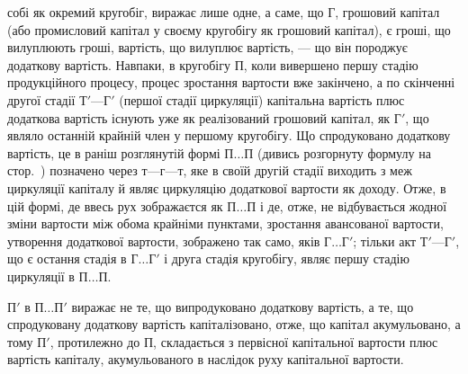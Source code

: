 \parcont{}  %
собі як окремий кругобіг, виражає лише одне, а саме, що $Г$, грошовий
капітал (або промисловий капітал у своєму кругобігу як грошовий
капітал), є гроші, що вилуплюють гроші, вартість, що вилуплює вартість,
— що він породжує додаткову вартість. Навпаки, в кругобігу $П$,
коли вивершено першу стадію продукційного процесу, процес зростання
вартости вже закінчено, а по скінченні другої стадії $Т' — Г'$ (першої
стадії циркуляції) капітальна вартість плюс додаткова вартість існують
уже як реалізований грошовий капітал, як $Г'$, що являло останній крайній
член у першому кругобігу. Що спродуковано додаткову вартість, це в
раніш розглянутій формі $П\dots{}П$ (дивись розгорнуту формулу на стор.~\pageref{original-41})
позначено через $т — г — т$, яке в своїй другій стадії виходить
з меж циркуляції капіталу й являє циркуляцію додаткової вартости як
доходу. Отже, в цій формі, де ввесь рух зображаєтся як $П\dots{} П$ і де,
отже, не відбувається жодної зміни вартости між обома крайніми пунктами,
зростання авансованої вартости, утворення додаткової вартости, зображено
так само, яків $Г\dots{} Г'$; тільки акт $Т' — Г'$, що є остання стадія в $Г\dots{} Г'$
і друга стадія кругобігу, являє першу стадію циркуляції в $П\dots{}П$.

$П'$ в $П\dots{}П'$ виражає не те, що випродуковано додаткову вартість, а
те, що спродуковану додаткову вартість капіталізовано, отже, що капітал
акумульовано, а тому $П'$, протилежно до $П$, складається з первісної капітальної
вартости плюс вартість капіталу, акумульованого в наслідок руху
капітальної вартости.

